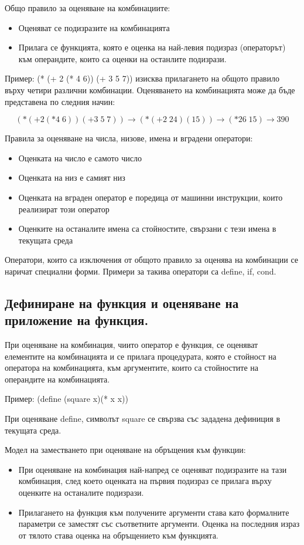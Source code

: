 \documentclass{article}
\renewcommand{\\}{\newline}
\begin{document}
Общо правило за оценяване на комбинациите:
\begin{itemize}
    \item Оценяват се подизразите на комбинацията
    \item Прилага се функцията, която е оценка на най-левия подизраз (операторът) към операндите, които са оценки на останлите подизрази.
\end{itemize}

Пример: (* (+ 2 (* 4 6)) (+ 3 5 7)) изисква прилагането на общото правило върху четири различни комбинации. Оценяването на комбинацията може да бъде представена по следния начин:

\[
  \left(* ( + 2 (* 4\;6))(+ 3\;5\;7)\right) \rightarrow \left(*(+ 2\;24)(15)\right) \rightarrow \left(* 26 \; 15\right) \rightarrow 390
\] 

Правила за оценяване на числа, низове, имена и вградени оператори:
\begin{itemize}
    \item Оценката на число е самото число
    \item Оценката на низ е самият низ
    \item Оценката на вграден оператор е поредица от машинни инструкции, които реализират този оператор
    \item Оценките на останалите имена са стойностите, свързани с тези имена в текущата среда
\end{itemize}

Оператори, които са изключения от общото правило за оценява на комбинации се наричат специални форми. Примери за такива оператори са define, if, cond.

\subsection{Дефиниране на функция и оценяване на приложение на функция.}

При оценяване на комбинация, чиито оператор е функция, се оценяват елементите на комбинацията и се прилага процедурата, която е стойност на оператора на комбинацията, към аргументите, които са стойностите на операндите на комбинацията.

Пример: (define (square x)(* x x))

При оценяване define, символът square се свързва със зададена дефиниция в текущата среда.

Модел на заместването при оценяване на обръщения към функции:\begin{itemize}
    \item При оценяване на комбинация най-напред се оценяват подизразите на тази комбинация, след което оценката на първия подизраз се прилага върху оценките на останалите подизрази.
    \item Прилагането на функция към получените аргументи става като формалните параметри се заместят със съответните аргументи. Оценка на последния израз от тялото става оценка на обръщението към функцията.
\end{itemize}
\end{document}
